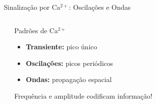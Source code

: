 \begin{frame}{Sinalização por Ca$^{2+}$: Oscilações e Ondas}
\begin{columns}
\begin{center}
\end{center}

\vspace{0.5cm}

\begin{exampleblock}{Padrões de Ca$^{2+}$}
\begin{itemize}
    \item \textbf{Transiente:} pico único
    \item \textbf{Oscilações:} picos periódicos
    \item \textbf{Ondas:} propagação espacial
\end{itemize}

Frequência e amplitude codificam informação!
\end{exampleblock}
\end{columns}
\end{frame}

